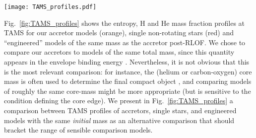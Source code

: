 \documentclass[twocolumn,twocolappendix,trackchanges]{aastex63}
\DeclareRobustCommand{\Eqref}[1]{Eq.~\ref{#1}}
\DeclareRobustCommand{\Figref}[1]{Fig.~\ref{#1}}
\begin{document}
\begin{figure*}[htbp]
  \centering
  \texttt{[image: TAMS\_profiles.pdf]}
  \caption{Specific entropy (top row), H (bottom row, solid lines),
    and He (bottom row, dashed lines) TAMS profiles for non-rotating
    single stars (red), accretors (orange), and ``engineered'' models
    of the same total mass as the post-RLOF mass of the accretors. The
    overlapping gray bands emphasize the CEB region, which is well
    defined at TAMS.}
  \label{fig:TAMS_profiles}
\end{figure*}

\Figref{fig:TAMS_profiles} shows the entropy, H and He mass fraction
profiles at TAMS for our accretor models (orange), single non-rotating
stars (red) and ``engineered'' models of the same mass as the accretor
post-RLOF. We chose to compare our accretors to models of the same
total mass, since this quantity appears in the envelope binding energy
\citep[see \Eqref{eq:BE} and e.g.,][]{dekool:1990, dewi:2000}.
Nevertheless, it is not obvious that this is the most relevant
comparison: for instance, the (helium or carbon-oxygen) core mass is often
used to determine the final compact object \citep[e.g.,][]{fryer:2012,
  farmer:2019, patton:2021, renzo:2022, fryer:2022}, and comparing models of roughly the same
core-mass might be more appropriate (but is sensitive to the condition
defining the core edge). We present in
\Figref{fig:TAMS_profiles} a comparison between TAMS
profiles of accretors, single stars, and engineered models with the
same \emph{initial} mass as an alternative comparison that should bracket the
range of sensible comparison models.
\end{document}

